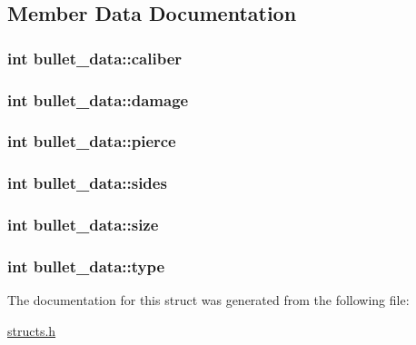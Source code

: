 \subsection{Member Data Documentation}
\hypertarget{structbullet__data_a4cd2f8ddc9532be2c419bd9c72d40d0c}{
\subsubsection[{caliber}]{\setlength{\rightskip}{0pt plus 5cm}int bullet\-\_\-data\-::caliber}}\label{structbullet__data_a4cd2f8ddc9532be2c419bd9c72d40d0c}
\hypertarget{structbullet__data_aa012aa2cf97fb23b12232add20680e3e}{
\subsubsection[{damage}]{\setlength{\rightskip}{0pt plus 5cm}int bullet\-\_\-data\-::damage}}\label{structbullet__data_aa012aa2cf97fb23b12232add20680e3e}
\hypertarget{structbullet__data_a510d249b12de0b08f29567e685114a62}{
\subsubsection[{pierce}]{\setlength{\rightskip}{0pt plus 5cm}int bullet\-\_\-data\-::pierce}}\label{structbullet__data_a510d249b12de0b08f29567e685114a62}
\hypertarget{structbullet__data_a590bb73ffd2f62831761cc9ee4b25571}{
\subsubsection[{sides}]{\setlength{\rightskip}{0pt plus 5cm}int bullet\-\_\-data\-::sides}}\label{structbullet__data_a590bb73ffd2f62831761cc9ee4b25571}
\hypertarget{structbullet__data_a049788b480ffdab91337c896044676d0}{
\subsubsection[{size}]{\setlength{\rightskip}{0pt plus 5cm}int bullet\-\_\-data\-::size}}\label{structbullet__data_a049788b480ffdab91337c896044676d0}
\hypertarget{structbullet__data_aa53aba68ad086bfd4ee338ca31b71e84}{
\subsubsection[{type}]{\setlength{\rightskip}{0pt plus 5cm}int bullet\-\_\-data\-::type}}\label{structbullet__data_aa53aba68ad086bfd4ee338ca31b71e84}


The documentation for this struct was generated from the following file\-:\begin{DoxyCompactItemize}
\item 
\hyperlink{structs_8h}{structs.\-h}\end{DoxyCompactItemize}
